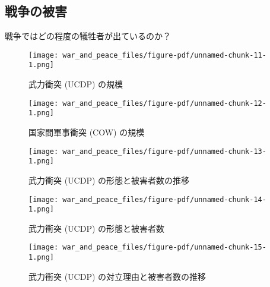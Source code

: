 \documentclass[
  xelatex,
  ja=standard]{bxjsarticle}
\begin{document}
\hypertarget{ux6226ux4e89ux306eux88abux5bb3}{%
\subsection{戦争の被害}\label{ux6226ux4e89ux306eux88abux5bb3}}

戦争ではどの程度の犠牲者が出ているのか？

\begin{figure}[htpb]

{\centering \texttt{[image: war\_and\_peace\_files/figure-pdf/unnamed-chunk-11-1.png]}

}

\caption{武力衝突 (UCDP) の規模}

\end{figure}

\begin{figure}[htpb]

{\centering \texttt{[image: war\_and\_peace\_files/figure-pdf/unnamed-chunk-12-1.png]}

}

\caption{国家間軍事衝突 (COW) の規模}

\end{figure}

\begin{figure}[htpb]

{\centering \texttt{[image: war\_and\_peace\_files/figure-pdf/unnamed-chunk-13-1.png]}

}

\caption{武力衝突 (UCDP) の形態と被害者数の推移}

\end{figure}

\begin{figure}[htpb]

{\centering \texttt{[image: war\_and\_peace\_files/figure-pdf/unnamed-chunk-14-1.png]}

}

\caption{武力衝突 (UCDP) の形態と被害者数}

\end{figure}

\begin{figure}[htpb]

{\centering \texttt{[image: war\_and\_peace\_files/figure-pdf/unnamed-chunk-15-1.png]}

}

\caption{武力衝突 (UCDP) の対立理由と被害者数の推移}

\end{figure}
\end{document}
